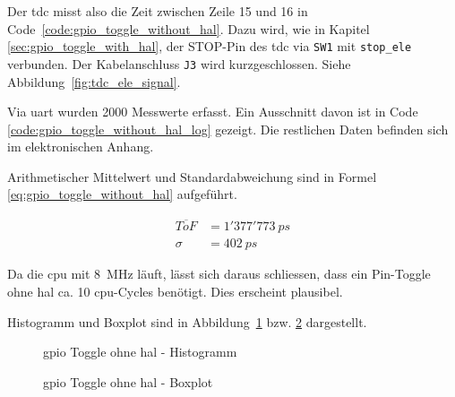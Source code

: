 \documentclass[11pt,a4paper,hidelinks]{article}
\begin{document}


Der \acrshort{tdc} misst also die Zeit zwischen Zeile 15 und 16 in Code~\ref{code:gpio_toggle_without_hal}. Dazu wird,
wie in Kapitel \ref{sec:gpio_toggle_with_hal}, der STOP-Pin des \acrshort{tdc} via \lstinline|SW1| mit
\lstinline|stop_ele| verbunden. Der Kabelanschluss \lstinline|J3| wird kurzgeschlossen. Siehe
Abbildung~\ref{fig:tdc_ele_signal}.

Via \acrshort{uart} wurden 2000 Messwerte erfasst. Ein Ausschnitt davon ist in Code
\ref{code:gpio_toggle_without_hal_log} gezeigt. Die restlichen Daten befinden sich im elektronischen Anhang.



Arithmetischer Mittelwert und Standardabweichung sind in Formel \ref{eq:gpio_toggle_without_hal} aufgeführt.

\begin{equation}\label{eq:gpio_toggle_without_hal}
    \begin{split}
        \overline{ToF} &= 1'377'773~ps\\
        \sigma         &= 402~ps
    \end{split}
\end{equation}

Da die \acrshort{cpu} mit 8~MHz läuft, lässt sich daraus schliessen, dass ein Pin-Toggle ohne \acrshort{hal} ca. 10
\acrshort{cpu}-Cycles benötigt. Dies erscheint plausibel.

Histogramm und Boxplot sind in Abbildung~\ref{fig:gpio_toggle_without_hal_histogram} bzw.
\ref{fig:gpio_toggle_without_hal_boxplot} dargestellt.

\begin{figure}[H]
    \centering
    
    \caption{\acrshort{gpio} Toggle ohne \acrshort{hal} - Histogramm}\label{fig:gpio_toggle_without_hal_histogram}
\end{figure}

\begin{figure}[H]
    \centering
    
    \caption{\acrshort{gpio} Toggle ohne \acrshort{hal} - Boxplot}\label{fig:gpio_toggle_without_hal_boxplot}
\end{figure}
\end{document}
